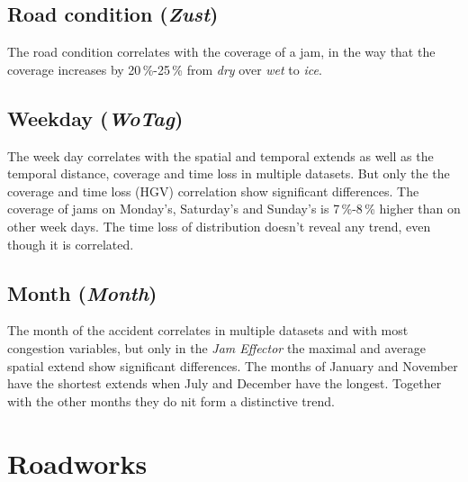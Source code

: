 \subsection{Road condition (\textit{Zust})}
The road condition correlates with the coverage of a jam, in the way that the coverage increases by 20\,\%-25\,\% from \textit{dry} over \textit{wet} to \textit{ice}.

\subsection{Weekday (\textit{WoTag})}
The week day correlates with the spatial and temporal extends as well as the temporal distance, coverage and time loss in multiple datasets. But only the the coverage and time loss (HGV) correlation show significant differences. The coverage of jams on Monday's, Saturday's and Sunday's is 7\,\%-8\,\% higher than on other week days. The time loss of distribution doesn't reveal any trend, even though it is correlated.

\subsection{Month (\textit{Month})}
The month of the accident correlates in multiple datasets and with most congestion variables, but only in the \textit{Jam Effector} the maximal and average spatial extend show significant differences. The months of January and November have the shortest extends when July and December have the longest. Together with the other months they do nit form a distinctive trend. 

\section{Roadworks}



